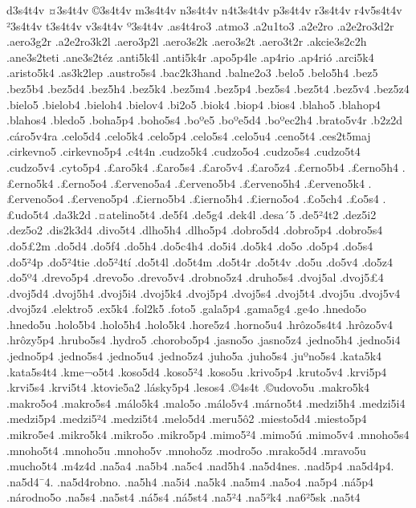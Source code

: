 {d3s4t4v
^^a43s4t4v
^^a93s4t4v
m3s4t4v
n3s4t4v
n4t3s4t4v
p3s4t4v
r3s4t4v
r4v5s4t4v
^^b23s4t4v
t3s4t4v
v3s4t4v
^^ba3s4t4v
.as4t4ro3
.atmo3
.a2u1to3
.a2e2ro
.a2e2ro3d2r
.aero3g2r
.a2e2ro3k2l
.aero3p2l
.aero3s2k
.aero3s2t
.aero3t2r
.akcie3s2c2h
.ane3s2teti
.ane3s2t^^e9z
.anti5k4l
.anti5k4r
.apo5p4le
.ap4rio
.ap4ri^^f3
.arci5k4
.aristo5k4
.as3k2lep
.austro5s4
.bac2k3hand
.balne2o3
.belo5
.belo5h4
.bez5
.bez5b4
.bez5d4
.bez5h4
.bez5k4
.bez5m4
.bez5p4
.bez5s4
.bez5t4
.bez5v4
.bez5z4
.bielo5
.bielob4
.bieloh4
.bielov4
.bi2o5
.biok4
.biop4
.bios4
.blaho5
.blahop4
.blahos4
.bledo5
.boha5p4
.boho5s4
.bo^^bae5
.bo^^bae5d4
.bo^^baec2h4
.brato5v4r
.b2z2d
.c^^e1ro5v4ra
.celo5d4
.celo5k4
.celo5p4
.celo5s4
.celo5u4
.ceno5t4
.ces2t5maj
.cirkevno5
.cirkevno5p4
.c4t4n
.cudzo5k4
.cudzo5o4
.cudzo5s4
.cudzo5t4
.cudzo5v4
.cyto5p4
.^^a3aro5k4
.^^a3aro5s4
.^^a3aro5v4
.^^a3aro5z4
.^^a3erno5b4
.^^a3erno5h4
.^^a3erno5k4
.^^a3erno5o4
.^^a3erveno5a4
.^^a3erveno5b4
.^^a3erveno5h4
.^^a3erveno5k4
.^^a3erveno5o4
.^^a3erveno5p4
.^^a3ierno5b4
.^^a3ierno5h4
.^^a3ierno5o4
.^^a3o5ch4
.^^a3o5s4
.^^a3udo5t4
.da3k2d
.^^a4atelino5t4
.de5f4
.de5g4
.dek4l
.desa^^b45
.de5^^b24t2
.dez5i2
.dez5o2
.dis2k3d4
.divo5t4
.dlho5h4
.dlho5p4
.dobro5d4
.dobro5p4
.dobro5s4
.do5^^a32m
.do5d4
.do5f4
.do5h4
.do5c4h4
.do5i4
.do5k4
.do5o
.do5p4
.do5s4
.do5^^b24p
.do5^^b24tie
.do5^^b24t^^ed
.do5t4l
.do5t4m
.do5t4r
.do5t4v
.do5u
.do5v4
.do5z4
.do5^^ba4
.drevo5p4
.drevo5o
.drevo5v4
.drobno5z4
.druho5s4
.dvoj5al
.dvoj5^^a34
.dvoj5d4
.dvoj5h4
.dvoj5i4
.dvoj5k4
.dvoj5p4
.dvoj5s4
.dvoj5t4
.dvoj5u
.dvoj5v4
.dvoj5z4
.elektro5
.ex5k4
.fol2k5
.foto5
.gala5p4
.gama5g4
.ge4o
.hnedo5o
.hnedo5u
.holo5b4
.holo5h4
.holo5k4
.hore5z4
.horno5u4
.hr^^f4zo5s4t4
.hr^^f4zo5v4
.hr^^f4zy5p4
.hrubo5s4
.hydro5
.chorobo5p4
.jasno5o
.jasno5z4
.jedno5h4
.jedno5i4
.jedno5p4
.jedno5s4
.jedno5u4
.jedno5z4
.juho5a
.juho5s4
.ju^^bano5s4
.kata5k4
.kata5s4t4
.kme^^aco5t4
.koso5d4
.koso5^^b24
.koso5u
.krivo5p4
.kruto5v4
.krvi5p4
.krvi5s4
.krvi5t4
.ktovie5a2
.l^^e1sky5p4
.lesos4
.^^a94s4t
.^^a9udovo5u
.makro5k4
.makro5o4
.makro5s4
.m^^e1lo5k4
.malo5o
.m^^e1lo5v4
.m^^e1rno5t4
.medzi5h4
.medzi5i4
.medzi5p4
.medzi5^^b24
.medzi5t4
.melo5d4
.meru5^^f42
.miesto5d4
.miesto5p4
.mikro5e4
.mikro5k4
.mikro5o
.mikro5p4
.mimo5^^b24
.mimo5^^fa
.mimo5v4
.mnoho5s4
.mnoho5t4
.mnoho5u
.mnoho5v
.mnoho5z
.modro5o
.mrako5d4
.mravo5u
.mucho5t4
.m4z4d
.na5a4
.na5b4
.na5c4
.nad5h4
.na5d4nes.
.nad5p4
.na5d4p4.
.na5d4^^af4.
.na5d4robno.
.na5h4
.na5i4
.na5k4
.na5m4
.na5o4
.na5p4
.n^^e15p4
.n^^e1rodno5o
.na5s4
.na5st4
.n^^e15s4
.n^^e15st4
.na5^^b24
.na5^^b2k4
.na6^^b25sk
.na5t4
}
